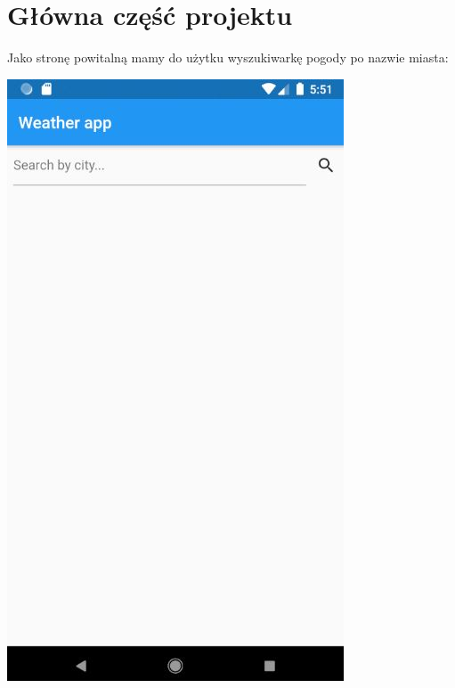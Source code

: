 \documentclass[12pt,a4paper]{article}
\begin{document}
	\section{Główna część projektu}
Jako stronę powitalną mamy do użytku wyszukiwarkę pogody po nazwie miasta: \\
    \begin{center}
        \includegraphics{1.JPG}

\end{center}
\end{document}
